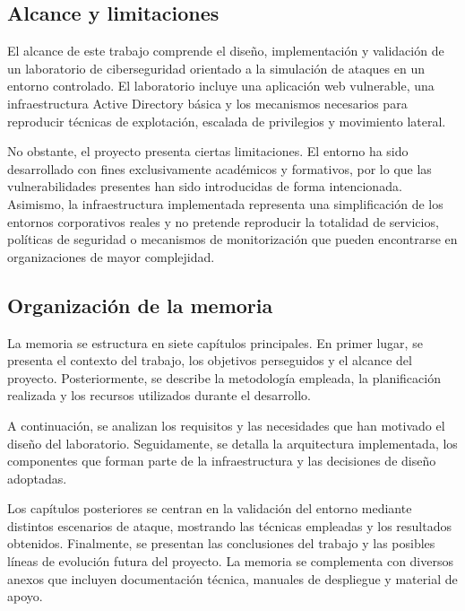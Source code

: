 \subsection{Alcance y limitaciones}

El alcance de este trabajo comprende el diseño, implementación y validación de un laboratorio de ciberseguridad orientado a la simulación de ataques en un entorno controlado. El laboratorio incluye una aplicación web vulnerable, una infraestructura Active Directory básica y los mecanismos necesarios para reproducir técnicas de explotación, escalada de privilegios y movimiento lateral.

No obstante, el proyecto presenta ciertas limitaciones. El entorno ha sido desarrollado con fines exclusivamente académicos y formativos, por lo que las vulnerabilidades presentes han sido introducidas de forma intencionada. Asimismo, la infraestructura implementada representa una simplificación de los entornos corporativos reales y no pretende reproducir la totalidad de servicios, políticas de seguridad o mecanismos de monitorización que pueden encontrarse en organizaciones de mayor complejidad.

\subsection{Organización de la memoria}

La memoria se estructura en siete capítulos principales. En primer lugar, se presenta el contexto del trabajo, los objetivos perseguidos y el alcance del proyecto. Posteriormente, se describe la metodología empleada, la planificación realizada y los recursos utilizados durante el desarrollo.

A continuación, se analizan los requisitos y las necesidades que han motivado el diseño del laboratorio. Seguidamente, se detalla la arquitectura implementada, los componentes que forman parte de la infraestructura y las decisiones de diseño adoptadas.

Los capítulos posteriores se centran en la validación del entorno mediante distintos escenarios de ataque, mostrando las técnicas empleadas y los resultados obtenidos. Finalmente, se presentan las conclusiones del trabajo y las posibles líneas de evolución futura del proyecto. La memoria se complementa con diversos anexos que incluyen documentación técnica, manuales de despliegue y material de apoyo.

